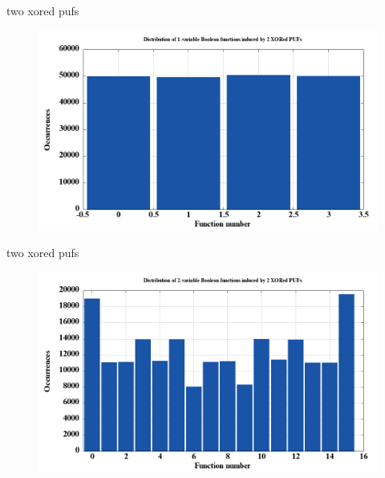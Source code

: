 \documentclass[10pt, compress]{beamer}
\begin{document}
\begin{frame}{two xored pufs}
    \begin{figure}
        \centering
        \includegraphics[width=\textwidth]{figures/dist/distribution_of_1-variable_boolean_functions_induced_by_2_xored_pufs.png}
    \end{figure}
\end{frame}

\begin{frame}{two xored pufs}
    \begin{figure}
        \centering
        \includegraphics[width=\textwidth]{figures/dist/distribution_of_2-variable_boolean_functions_induced_by_2_xored_pufs.png}
    \end{figure}
\end{frame}
\end{document}
